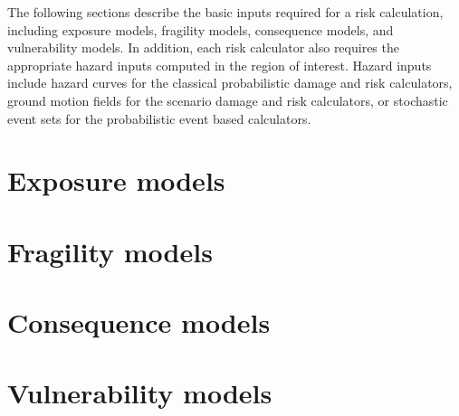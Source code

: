 The following sections describe the basic inputs required for a risk
calculation, including exposure models, fragility models, consequence models,
and vulnerability models. In addition, each risk calculator also requires the
appropriate hazard inputs computed in the region of interest. Hazard inputs
include hazard curves for the classical probabilistic damage and risk
calculators, ground motion fields for the scenario damage and risk
calculators, or stochastic event sets for the probabilistic event based
calculators.


\section{Exposure models}
\label{sec:exposure}


\section{Fragility models}
\label{sec:fragility}


\section{Consequence models}
\label{sec:consequence}


\section{Vulnerability models}
\label{sec:vulnerability}

